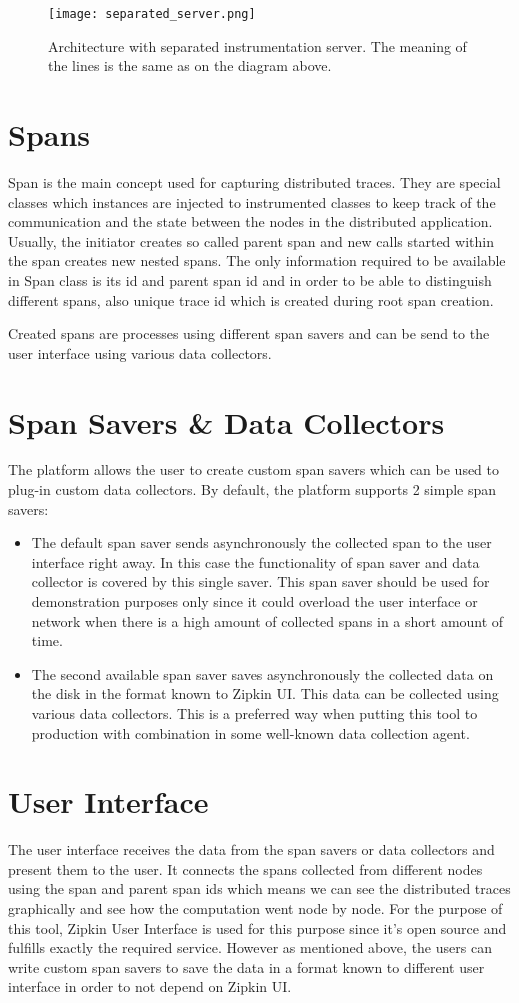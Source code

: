 \begin{figure}
	\centering
	\texttt{[image: separated\_server.png]}
	\caption{Architecture with separated instrumentation server. The meaning of the lines is the same as on the diagram above.}
	\label{fig:separated_server}
\end{figure}

\section{Spans}
Span is the main concept used for capturing distributed traces. They are special classes which instances are injected to instrumented classes to keep track of the communication and the state between the nodes in the distributed application. Usually, the initiator creates so called parent span and new calls started within the span creates new nested spans. The only information required to be available in Span class is its id and parent span id and in order to be able to distinguish different spans, also unique trace id which is created during root span creation. 

Created spans are processes using different span savers and can be send to the user interface using various data collectors.
\section{Span Savers \& Data Collectors}
The platform allows the user to create custom span savers which can be used to plug-in custom data collectors. By default, the platform supports 2 simple span savers:
\begin{itemize}
	\item The default span saver sends asynchronously the collected span to the user interface right away. In this case the functionality of span saver and data collector is covered by this single saver. This span saver should be used for demonstration purposes only since it could overload the user interface or network when there is a high amount of collected spans in a short amount of time.
	\item The second available span saver saves asynchronously the collected data on the disk in the format known to Zipkin UI. This data can be collected using various data collectors. This is a preferred way when putting this tool to production with combination in some well-known data collection agent.
\end{itemize}
\section{User Interface}
The user interface receives the data from the span savers or data collectors and present them to the user. It connects the spans collected from different nodes using the span and parent span ids which means we can see the distributed traces graphically and see how the computation went node by node. For the purpose of this tool, Zipkin User Interface is used for this purpose since it's open source and fulfills exactly the required service. However as mentioned above, the users can write custom span savers to save the data in a format known to different user interface in order to not depend on Zipkin UI.
